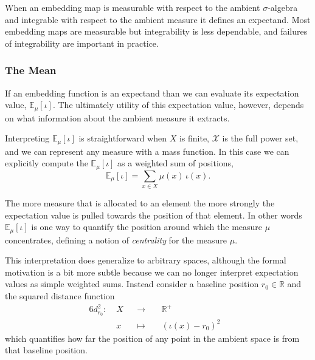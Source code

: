 \documentclass[
  letterpaper,
  DIV=11,
  numbers=noendperiod]{scrartcl}
\begin{document}
When an embedding map is measurable with respect to the ambient
\(\sigma\)-algebra and integrable with respect to the ambient measure it
defines an expectand. Most embedding maps are measurable but
integrability is less dependable, and failures of integrability are
important in practice.

\hypertarget{the-mean}{%
\subsubsection{The Mean}\label{the-mean}}

If an embedding function is an expectand than we can evaluate its
expectation value, \(\mathbb{E}_{\mu}[\iota]\). The ultimately utility
of this expectation value, however, depends on what information about
the ambient measure it extracts.

Interpreting \(\mathbb{E}_{\mu}[\iota]\) is straightforward when \(X\)
is finite, \(\mathcal{X}\) is the full power set, and we can represent
any measure with a mass function. In this case we can explicitly compute
the \(\mathbb{E}_{\mu}[\iota]\) as a weighted sum of positions, \[
\mathbb{E}_{\mu}[\iota] = \sum_{x \in X} \mu(x) \, \iota(x).
\]

The more measure that is allocated to an element the more strongly the
expectation value is pulled towards the position of that element. In
other words \(\mathbb{E}_{\mu}[\iota]\) is one way to quantify the
position around which the measure \(\mu\) concentrates, defining a
notion of \emph{centrality} for the measure \(\mu\).

This interpretation does generalize to arbitrary spaces, although the
formal motivation is a bit more subtle because we can no longer
interpret expectation values as simple weighted sums. Instead consider a
baseline position \(r_{0} \in \mathbb{R}\) and the squared distance
function \begin{alignat*}{6}
d_{r_{0}}^{2} :\; & X & &\rightarrow& \; &\mathbb{R}^{+}&
\\
& x & &\mapsto& & (\iota(x) - r_{0})^{2} &
\end{alignat*} which quantifies how far the position of any point in the
ambient space is from that baseline position.
\end{document}
